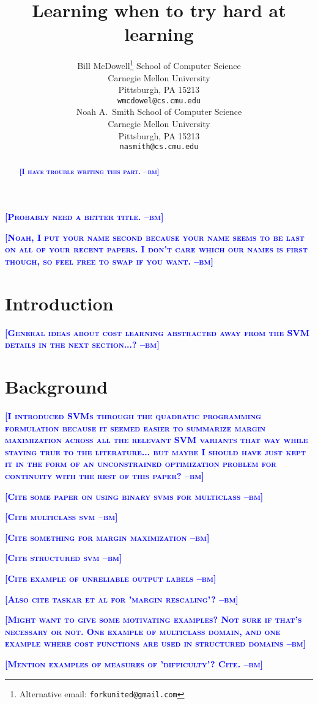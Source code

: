 \documentclass{article} %
\title{Learning when to try hard at learning}
\author{
Bill McDowell\thanks{Alternative email: \texttt{forkunited@gmail.com}}
School of Computer Science\\
Carnegie Mellon University\\
Pittsburgh, PA 15213 \\
\texttt{wmcdowel@cs.cmu.edu} \\
\And
Noah A.~Smith
School of Computer Science\\
Carnegie Mellon University\\
Pittsburgh, PA 15213 \\
\texttt{nasmith@cs.cmu.edu} \\
}
\newcommand{\bmcomment}[1]{\textcolor{blue}{\textsc{\textbf{[#1 --bm]}}}}
\begin{document}
\maketitle

\bmcomment{Probably need a better title.}

\bmcomment{Noah, I put your name second because your name seems 
to be last on all of your recent papers.  I don't care which our names is
first though, so feel free to swap if you want.}

\begin{abstract}
\bmcomment{I have trouble writing this part.}
\end{abstract}

\section{Introduction}

\bmcomment{General ideas about cost learning abstracted away
from the SVM details in the next section...?}

\section{Background}

\bmcomment{I introduced SVMs through the quadratic programming
formulation because it seemed easier to summarize margin maximization
across all the relevant SVM variants that way while staying true to the literature... 
but maybe I should have just kept it in the form
of an unconstrained optimization problem for continuity with the rest
of this paper?}

\bmcomment{Cite some paper on using binary svms for multiclass}

\bmcomment{Cite multiclass svm}

\bmcomment{Cite something for margin maximization}

\bmcomment{Cite structured svm}

\bmcomment{Cite example of unreliable output labels}

\bmcomment{Also cite taskar et al for 'margin rescaling'?}

\bmcomment{Might want to give some motivating examples? Not sure if that's
necessary or not. One example of multiclass domain, and one example where
cost functions are used in structured domains}

\bmcomment{Mention examples of measures of 'difficulty'? Cite.}
\end{document}
